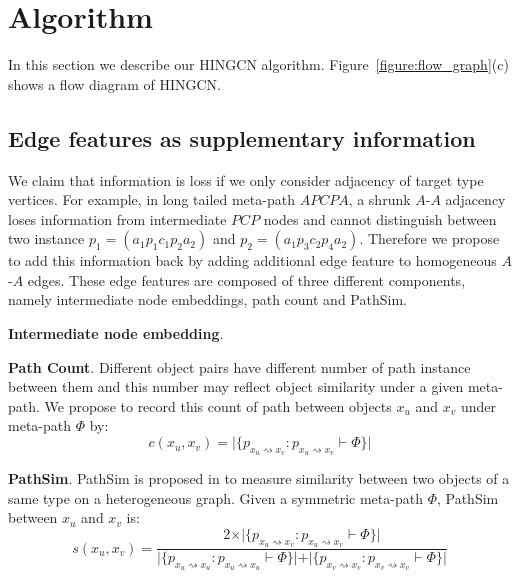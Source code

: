 \section{Algorithm}
\label{sec:algorithm}

In this section we describe our HINGCN algorithm. Figure~\ref{figure:flow_graph}(c) shows a flow diagram of HINGCN. 

\subsection{Edge features as supplementary information}
\label{sec:edge}
We claim that information is loss if we only consider adjacency of target type vertices. For example, in long tailed meta-path $APCPA$, a shrunk $A$-$A$ adjacency loses information from intermediate $PCP$ nodes and cannot distinguish between two instance $p_1 = (a_1 p_1 c_1 p_2 a_2)$ and $p_2 = (a_1 p_3 c_2 p_4 a_2)$. Therefore we propose to add this information back by adding additional edge feature to homogeneous $A$-$A$ edges. These edge features are composed of three different components, namely intermediate node embeddings, path count and PathSim\citep{SunHYYW11}.

\noindent{\small$\bullet$}\textbf{Intermediate node embedding}. 

\noindent{\small$\bullet$}\textbf{Path Count}. Different object pairs have different number of path instance between them and this number may reflect object similarity under a given meta-path. We propose to record this count of path between objects $x_u$ and $x_v$  under meta-path $\Phi$ by: 
\begin{equation*}
c(x_u,x_v) = \vert\{ p_{x_u \rightsquigarrow x_v}:p_{x_u \rightsquigarrow x_v} \vdash \Phi \}\vert
\end{equation*}

\noindent{\small$\bullet$}\textbf{PathSim}. 
PathSim is proposed in \citep{SunHYYW11} to measure similarity between two objects of a same type on a heterogeneous graph. Given a symmetric meta-path $\Phi$, PathSim between $x_u$ and $x_v$ is:
\begin{equation*}
s(x_u,x_v) = \frac{2\times\vert\{ p_{x_u \rightsquigarrow x_v}:p_{x_u \rightsquigarrow x_v} \vdash \Phi \}\vert}{\vert\{ p_{x_u \rightsquigarrow x_u}:p_{x_u \rightsquigarrow x_u} \vdash \Phi \}\vert +\vert\{ p_{x_v \rightsquigarrow x_v}:p_{x_v \rightsquigarrow x_v} \vdash \Phi \}\vert }
\end{equation*}

